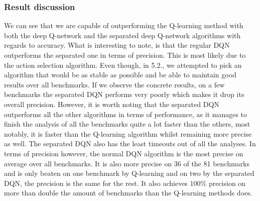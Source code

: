 \subsubsection{Result discussion}
We can see that we are capable of outperforming the Q-learning method with both the deep Q-network and the separated deep Q-network algorithms with regards to accuracy. What is interesting to note, is that the regular DQN outperforms the separated one in terms of precision. This is most likely due to the action selection algorithm. Even though, in 5.2., we attempted to pick an algorithm that would be as stable as possible and be able to maintain good results over all benchmarks. If we observe the concrete results, on a few benchmarks the separated DQN performs very poorly which makes it drop its overall precision. However, it is worth noting that the separated DQN outperforms all the other algorithms in terms of performance, as it manages to finish the analysis of all the benchmarks quite a lot faster than the others, most notably, it is faster than the Q-learning algorithm whilst remaining more precise as well. The separated DQN also has the least timeouts out of all the analyses. In terms of precision however, the normal DQN algorithm is the most precise on average over all benchmarks. It is also more precise on 36 of the 81 benchmarks and is only beaten on one benchmark by Q-learning and on two by the separated DQN, the precision is the same for the rest. It also achieves $100\%$ precision on more than double the amount of benchmarks than the Q-learning methods does.  
































